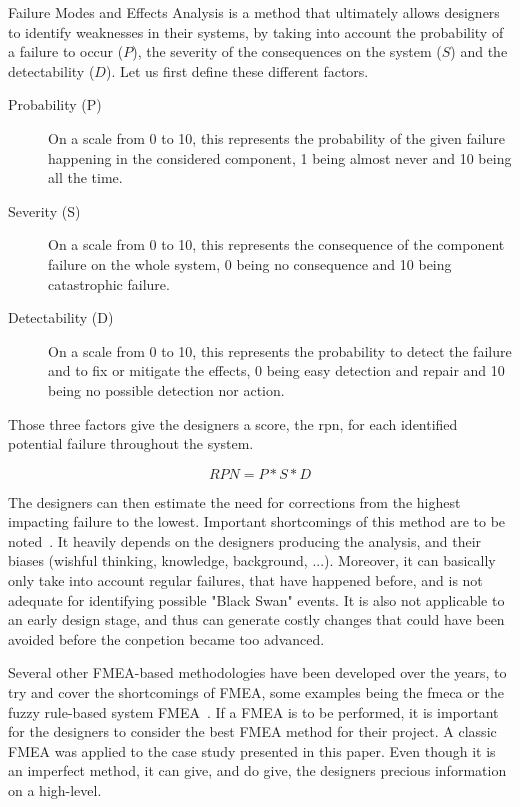 Failure Modes and Effects Analysis is a method that ultimately allows designers to identify weaknesses in their systems, by taking into account the probability of a failure to occur ($P$), the severity of the consequences on the system ($S$) and the detectability ($D$). Let us first define these different factors.

\begin{description}

\item[Probability (P)]
On a scale from 0 to 10, this represents the probability of the given failure happening in the considered component, 1 being almost never and 10 being all the time.

\item[Severity (S)]
On a scale from 0 to 10, this represents the consequence of the component failure on the whole system, 0 being no consequence and 10 being catastrophic failure.

\item[Detectability (D)]
On a scale from 0 to 10, this represents the probability to detect the failure and to fix or mitigate the effects, 0 being easy detection and repair and 10 being no possible detection nor action.

\end{description}

Those three factors give the designers a score, the \gls{rpn}, for each identified potential failure throughout the system.

\begin{equation}
RPN = P * S * D
\end{equation}

The designers can then estimate the need for corrections from the highest impacting failure to the lowest. Important shortcomings of this method are to be noted~\cite{liu2013}. It heavily depends on the designers producing the analysis, and their biases (wishful thinking, knowledge, background, ...). Moreover, it can basically only take into account regular failures, that have happened before, and is not adequate for identifying possible "Black Swan" events. It is also not applicable to an early design stage, and thus can generate costly changes that could have been avoided before the conpetion became too advanced.

Several other FMEA-based methodologies have been developed over the years, to try and cover the shortcomings of FMEA, some examples being the \gls{fmeca} or the fuzzy rule-based system FMEA~\cite{bowles1995}. If a FMEA is to be performed, it is important for the designers to consider the best FMEA method for their project. A classic FMEA was applied to the case study presented in this paper. Even though it is an imperfect method, it can give, and do give, the designers precious information on a high-level.

